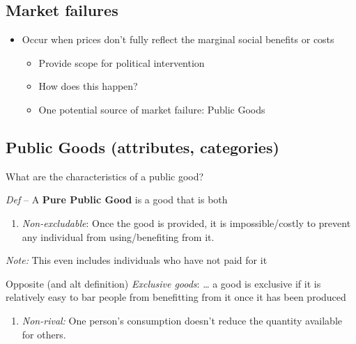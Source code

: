 \documentclass[]{article}
\providecommand{\tightlist}{%
  \setlength{\itemsep}{0pt}\setlength{\parskip}{0pt}}
\begin{document}
\hypertarget{market-failures}{%
\subsection{Market failures}\label{market-failures}}

\begin{itemize}
\tightlist
\item
  Occur when prices don't fully reflect the marginal social benefits or
  costs

  \begin{itemize}
  \tightlist
  \item
    Provide scope for political intervention
  \item
    How does this happen?
  \item
    One potential source of market failure: Public Goods
  \end{itemize}
\end{itemize}

\hypertarget{public-goods-attributes-categories}{%
\subsection{Public Goods (attributes,
categories)}\label{public-goods-attributes-categories}}

What are the characteristics of a public good?

\emph{Def} -- A \textbf{Pure Public Good} is a good that is both

\bigskip

\begin{enumerate}
\def\labelenumi{\arabic{enumi}.}
\tightlist
\item
  \emph{Non-excludable}: Once the good is provided, it is
  impossible/costly to prevent any individual from using/benefiting from
  it.
\end{enumerate}

\emph{Note:} This even includes individuals who have not paid for it

\bigskip

Opposite (and alt definition) \emph{Exclusive goods}: \ldots{} a good is
exclusive if it is relatively easy to bar people from benefitting from
it once it has been produced

\bigskip

\begin{enumerate}
\def\labelenumi{\arabic{enumi}.}
\setcounter{enumi}{1}
\tightlist
\item
  \emph{Non-rival:} One person's consumption doesn't reduce the quantity
  available for others.
\end{enumerate}
\end{document}

